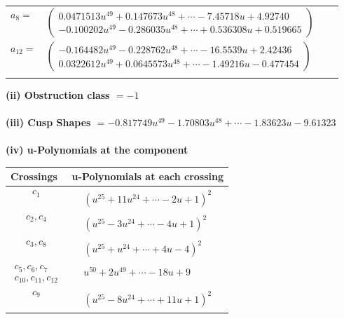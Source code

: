 \documentclass[1p]{elsarticle_modified}
\theoremstyle{definition}
\begin{document}
\begin{tabular}{m{7pt} m{180pt} m{7pt} m{180pt} }
\flushright $a_{8}=$&$\begin{pmatrix}0.0471513 u^{49}+0.147673 u^{48}+\cdots-7.45718 u+4.92740\\-0.100202 u^{49}-0.286035 u^{48}+\cdots+0.536308 u+0.519665\end{pmatrix}$ \\
\flushright $a_{12}=$&$\begin{pmatrix}-0.164482 u^{49}-0.228762 u^{48}+\cdots-16.5539 u+2.42436\\0.0322612 u^{49}+0.0645573 u^{48}+\cdots-1.49216 u-0.477454\end{pmatrix}$\\&\end{tabular}
\flushleft \textbf{(ii) Obstruction class $= -1$}\\~\\
\flushleft \textbf{(iii) Cusp Shapes $= -0.817749 u^{49}-1.70803 u^{48}+\cdots-1.83623 u-9.61323$}\\~\\
\newpage\renewcommand{\arraystretch}{1}
\flushleft \textbf{(iv) u-Polynomials at the component}\newline \\
\begin{tabular}{m{50pt}|m{274pt}}
Crossings & \hspace{64pt}u-Polynomials at each crossing \\
\hline $$\begin{aligned}c_{1}\end{aligned}$$&$\begin{aligned}
&(u^{25}+11 u^{24}+\cdots-2 u+1)^{2}
\end{aligned}$\\
\hline $$\begin{aligned}c_{2},c_{4}\end{aligned}$$&$\begin{aligned}
&(u^{25}-3 u^{24}+\cdots-4 u+1)^{2}
\end{aligned}$\\
\hline $$\begin{aligned}c_{3},c_{8}\end{aligned}$$&$\begin{aligned}
&(u^{25}+u^{24}+\cdots+4 u-4)^{2}
\end{aligned}$\\
\hline $$\begin{aligned}c_{5},c_{6},c_{7}\\c_{10},c_{11},c_{12}\end{aligned}$$&$\begin{aligned}
&u^{50}+2 u^{49}+\cdots-18 u+9
\end{aligned}$\\
\hline $$\begin{aligned}c_{9}\end{aligned}$$&$\begin{aligned}
&(u^{25}-8 u^{24}+\cdots+11 u+1)^{2}
\end{aligned}$\\
\hline
\end{tabular}\\~\\
\end{document}
